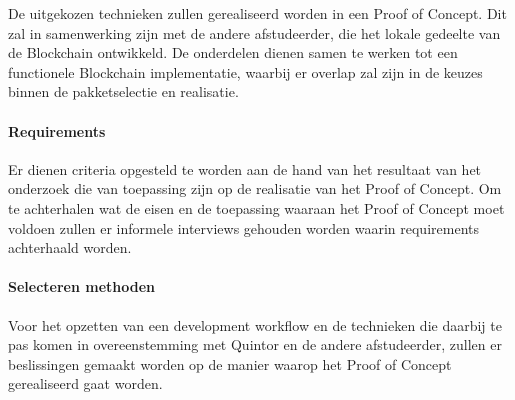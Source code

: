 De uitgekozen technieken zullen gerealiseerd worden in een Proof of Concept. Dit zal in samenwerking zijn met de andere afstudeerder, die het lokale gedeelte van de Blockchain ontwikkeld. De onderdelen dienen samen te werken tot een functionele Blockchain implementatie, waarbij er overlap zal zijn in de keuzes binnen de pakketselectie en realisatie.

\paragraph{Requirements} Er dienen criteria opgesteld te worden aan de hand van het resultaat van het onderzoek die van toepassing zijn op de realisatie van het Proof of Concept. Om te achterhalen wat de eisen en de toepassing waaraan het Proof of Concept moet voldoen zullen er informele interviews gehouden worden waarin requirements achterhaald worden.

\paragraph{Selecteren methoden} Voor het opzetten van een development workflow en de technieken die daarbij te pas komen in overeenstemming met Quintor en de andere afstudeerder, zullen er beslissingen gemaakt worden op de manier waarop het Proof of Concept gerealiseerd gaat worden.
